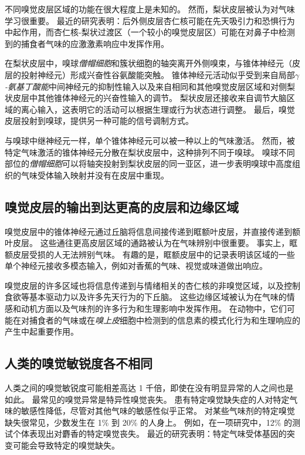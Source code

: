 不同嗅觉皮层区域的功能在很大程度上是未知的。
然而，梨状皮层被认为对气味学习很重要。
最近的研究表明：后外侧皮层杏仁核可能在先天吸引力和恐惧行为中起作用，而杏仁核-梨状过渡区（一个较小的嗅觉皮层区）可能在对鼻子中检测到的捕食者气味的应激激素响应中发挥作用。


在梨状皮层中，嗅球\textit{僧帽细胞}和簇状细胞的轴突离开外侧嗅束，与锥体神经元（皮层的投射神经元）形成兴奋性谷氨酸能突触。
锥体神经元活动似乎受到来自局部\textit{$\gamma$-氨基丁酸能}中间神经元的抑制性输入以及来自相同和其他嗅觉皮层区域和对侧梨状皮层中其他锥体神经元的兴奋性输入的调节。
梨状皮层还接收来自调节大脑区域的离心输入，这表明它的活动可以根据生理或行为状态进行调整。
最后，嗅觉皮层投射到嗅球，提供另一种可能的信号调制方式。


与嗅球中继神经元一样，单个锥体神经元可以被一种以上的气味激活。
然而，被特定气味激活的锥体神经元分散在梨状皮层中，这种排列不同于嗅球。
嗅球不同部位的\textit{僧帽细胞}可以将轴突投射到梨状皮层的同一亚区，进一步表明嗅球中高度组织的气味受体输入映射并没有在皮层中重现。



\subsection{嗅觉皮层的输出到达更高的皮层和边缘区域}

嗅觉皮层中的锥体神经元通过丘脑将信息间接传递到眶额叶皮层，并直接传递到额叶皮层。
这些通往更高皮层区域的通路被认为在气味辨别中很重要。
事实上，眶额皮层受损的人无法辨别气味。
有趣的是，眶额皮层中的记录表明该区域的一些单个神经元接收多模态输入，例如对香蕉的气味、视觉或味道做出响应。


嗅觉皮层的许多区域也将信息传递到与情绪相关的杏仁核的非嗅觉区域，以及控制食欲等基本驱动力以及许多先天行为的下丘脑。
这些边缘区域被认为在气味的情感和动机方面以及气味剂的许多行为和生理影响中发挥作用。
在动物中，它们可能在对捕食者的气味或在\textit{嗅上皮}细胞中检测到的信息素的模式化行为和生理响应的产生中起重要作用。



\subsection{人类的嗅觉敏锐度各不相同}

人类之间的嗅觉敏锐度可能相差高达 1 千倍，即使在没有明显异常的人之间也是如此。
最常见的嗅觉异常是特异性嗅觉丧失。
患有特定嗅觉缺失症的人对特定气味的敏感性降低，尽管对其他气味的敏感性似乎正常。
对某些气味剂的特定嗅觉缺失很常见，少数发生在 1\% 到 20\% 的人身上。
例如，在一项研究中，12\% 的测试个体表现出对麝香的特定嗅觉丧失。
最近的研究表明：特定气味受体基因的突变可能会导致特定的嗅觉缺失。


